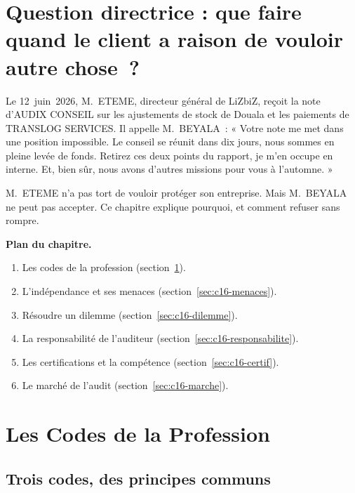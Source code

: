 \bigskip

\section*{Question directrice : que faire quand le client a raison de vouloir autre chose~?}

Le 12~juin~2026, M.~ETEME, directeur général de LiZbiZ, reçoit la note
d'AUDIX CONSEIL sur les ajustements de stock de Douala et les paiements de
TRANSLOG SERVICES. Il appelle M.~BEYALA~: « Votre note me met dans une
position impossible. Le conseil se réunit dans dix jours, nous sommes en
pleine levée de fonds. Retirez ces deux points du rapport, je m'en occupe en
interne. Et, bien sûr, nous avons d'autres missions pour vous à
l'automne. »

M.~ETEME n'a pas tort de vouloir protéger son entreprise. Mais M.~BEYALA ne
peut pas accepter. Ce chapitre explique pourquoi, et comment refuser sans
rompre.

\medskip
\textbf{Plan du chapitre.}
\begin{enumerate}
    \item Les codes de la profession (section~\ref{sec:c16-codes}).
    \item L'indépendance et ses menaces (section~\ref{sec:c16-menaces}).
    \item Résoudre un dilemme (section~\ref{sec:c16-dilemme}).
    \item La responsabilité de l'auditeur (section~\ref{sec:c16-responsabilite}).
    \item Les certifications et la compétence (section~\ref{sec:c16-certif}).
    \item Le marché de l'audit (section~\ref{sec:c16-marche}).
\end{enumerate}

\separateur

\section{Les Codes de la Profession}
\label{sec:c16-codes}

\subsection{Trois codes, des principes communs}

